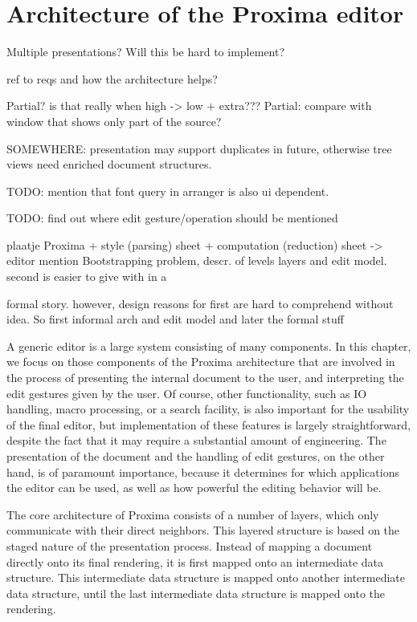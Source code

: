 \chapter{Architecture of the Proxima editor} \label{chap:proxArch}

\bc
Multiple presentations? Will this be hard to implement?

ref to reqs and how the architecture helps?

Partial? is that really when high -> low + extra???
Partial: compare with window that shows only part of the source?

SOMEWHERE: presentation may support duplicates in future, otherwise tree views need enriched 
 document structures.

TODO: mention that font query in arranger is also ui dependent.

TODO: find out where edit gesture/operation should be mentioned

plaatje Proxima + style (parsing) sheet + computation (reduction) sheet -> editor mention Bootstrapping problem, descr. of levels layers and edit model. second is easier to give with in a

formal story. however, design reasons for first are hard to comprehend without idea. So first informal arch 
 and edit model and later the formal stuff
\ec




A generic editor is a large system consisting of many components. In this chapter, we focus on those components of the Proxima architecture that are involved in the process of presenting the internal document to the user, and interpreting the edit gestures given by the user. Of course, other functionality, such as IO handling, macro processing, or a search facility, is also important for the usability of the final editor, but implementation of these features is largely straightforward, despite the fact that it may require a substantial amount of engineering. The presentation of the document and the handling of edit gestures, on the other hand, is of paramount importance, because it determines for which applications the editor can be used, as well as how powerful the editing behavior will be.

The core architecture of Proxima consists of a number of layers, which only communicate with their direct neighbors. This layered structure is based on the staged nature of the presentation process. Instead of mapping a document directly onto its final rendering, it is first mapped onto an intermediate data structure. This intermediate data structure is mapped onto another intermediate data structure, until the last intermediate data structure is mapped onto the rendering. 

